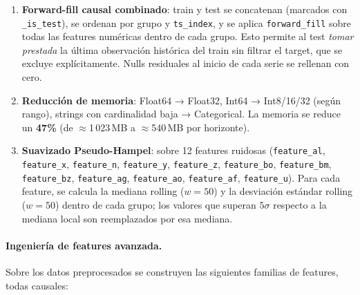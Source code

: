 \documentclass{article}
\begin{document}
\begin{enumerate}
    \item \textbf{Forward-fill causal combinado}: train y test se concatenan (marcados con \texttt{\_is\_test}), se ordenan por grupo y \texttt{ts\_index}, y se aplica \texttt{forward\_fill} sobre todas las features numéricas dentro de cada grupo. Esto permite al test \emph{tomar prestada} la última observación histórica del train sin filtrar el target, que se excluye explícitamente. Nulls residuales al inicio de cada serie se rellenan con cero.
    \item \textbf{Reducción de memoria}: Float64 → Float32, Int64 → Int8/16/32 (según rango), strings con cardinalidad baja → Categorical. La memoria se reduce un \textbf{47\%} (de $\approx$1\,023\,MB a $\approx$540\,MB por horizonte).
    \item \textbf{Suavizado Pseudo-Hampel}: sobre 12 features ruidosas (\texttt{feature\_al}, \texttt{feature\_x}, \texttt{feature\_n}, \texttt{feature\_y}, \texttt{feature\_z}, \texttt{feature\_bo}, \texttt{feature\_bm}, \texttt{feature\_bz}, \texttt{feature\_ag}, \texttt{feature\_ao}, \texttt{feature\_af}, \texttt{feature\_u}). Para cada feature, se calcula la mediana rolling ($w=50$) y la desviación estándar rolling ($w=50$) dentro de cada grupo; los valores que superan $5\sigma$ respecto a la mediana local son reemplazados por esa mediana.
\end{enumerate}

\paragraph{Ingeniería de features avanzada.}
Sobre los datos preprocesados se construyen las siguientes familias de features, todas causales:
\end{document}
